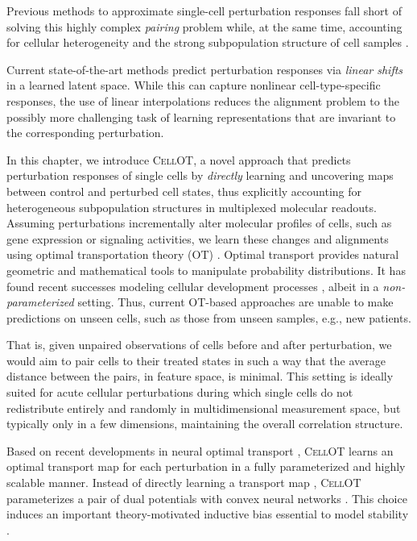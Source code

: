 Previous methods to approximate single-cell perturbation responses fall short of solving this highly complex \emph{pairing} problem while, at the same time,
accounting for cellular heterogeneity and the strong subpopulation structure of cell samples \cite{wu2021,gonzalez-silva2020,li2022}.

Current state-of-the-art methods \cite{lopez2018, lotfollahi2019, yang2020} predict perturbation responses via \emph{linear shifts} in a learned %
latent space.
While this can capture nonlinear cell-type-specific responses, the use of linear interpolations reduces the alignment problem 
to the possibly more challenging task of learning representations that are invariant to the corresponding perturbation.


In this chapter, we introduce \textsc{CellOT}, a novel approach that predicts perturbation responses of single cells by \emph{directly} learning and uncovering maps 
between control and perturbed cell states, thus explicitly accounting for heterogeneous subpopulation structures in multiplexed molecular readouts.
Assuming perturbations incrementally alter molecular profiles of cells, such as gene expression or signaling activities,
we learn these changes and alignments using optimal transportation theory (OT) \cite{villani2009}.
Optimal transport provides natural geometric and mathematical tools to manipulate probability distributions.
It has found recent successes modeling cellular development processes \cite{lavenant2023, schiebinger2019},
albeit in a \emph{non-parameterized} setting.
Thus, current OT-based approaches are unable to make predictions on unseen cells, such as those from unseen samples, e.g., new patients.

That is, given unpaired observations of cells before and after perturbation,
we would aim to pair cells to their treated states in such a way that the average distance between the pairs, in feature space, is minimal.
This setting is ideally suited for acute cellular perturbations during which single cells do not redistribute entirely and randomly in multidimensional measurement space,
but typically only in a few dimensions, maintaining the overall correlation structure.

Based on recent developments in neural optimal transport \cite{makkuva2020},
\textsc{CellOT} learns an optimal transport map for each perturbation in a fully parameterized and highly scalable manner.
Instead of directly learning a transport map \cite{leygonie2019, yang2020, prasad2022},
\textsc{CellOT} parameterizes a pair of dual potentials with convex neural networks \cite{amos2017}.
This choice induces an important theory-motivated inductive bias essential to model stability \cite{makkuva2020}.


